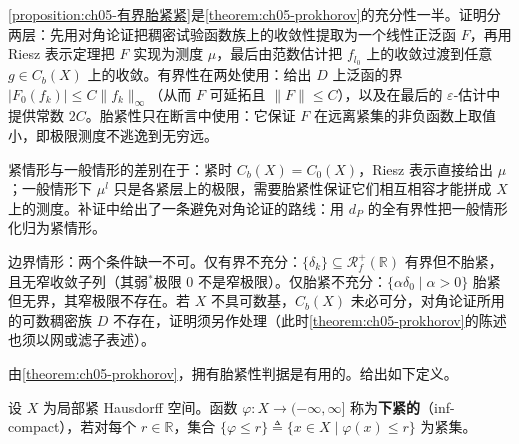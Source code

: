 \documentclass[../../main.tex]{subfiles}%
\begin{document}
\begin{remark}\label{remark:ch05-有界胎紧紧动机}
\cref{proposition:ch05-有界胎紧紧}是\cref{theorem:ch05-prokhorov}的充分性一半。证明分两层：先用对角论证把稠密试验函数族上的收敛性提取为一个线性正泛函 $F$，再用 Riesz 表示定理把 $F$ 实现为测度 $\mu$，最后由范数估计把 $f_{l_0}$ 上的收敛过渡到任意 $g\in C_b(X)$ 上的收敛。有界性在两处使用：给出 $D$ 上泛函的界 $|F_0(f_k)|\leqslant C\|f_k\|_\infty$（从而 $F$ 可延拓且 $\|F\|\leqslant C$），以及在最后的 $\varepsilon$-估计中提供常数 $2C$。胎紧性只在断言中使用：它保证 $F$ 在远离紧集的非负函数上取值小，即极限测度不逃逸到无穷远。

紧情形与一般情形的差别在于：紧时 $C_b(X)=C_0(X)$，Riesz 表示直接给出 $\mu$；一般情形下 $\mu^l$ 只是各紧层上的极限，需要胎紧性保证它们相互相容才能拼成 $X$ 上的测度。补证中给出了一条避免对角论证的路线：用 $d_P$ 的全有界性把一般情形化归为紧情形。

边界情形：两个条件缺一不可。仅有界不充分：$\{\delta_k\}\subseteq\mathscr{R}^+_f(\mathbb{R})$ 有界但不胎紧，且无窄收敛子列（其弱$^*$极限 $0$ 不是窄极限）。仅胎紧不充分：$\{\alpha\delta_0\mid\alpha>0\}$ 胎紧但无界，其窄极限不存在。若 $X$ 不具可数基，$C_b(X)$ 未必可分，对角论证所用的可数稠密族 $D$ 不存在，证明须另作处理（此时\cref{theorem:ch05-prokhorov}的陈述也须以网或滤子表述）。
\end{remark}

由\cref{theorem:ch05-prokhorov}，拥有胎紧性判据是有用的。给出如下定义。

\begin{definition}\label{definition:ch05-下紧}
设 $X$ 为局部紧 Hausdorff 空间。函数 $\varphi:X\to(-\infty,\infty]$ 称为\textbf{下紧的}（inf-compact），若对每个 $r\in\mathbb{R}$，集合 $\{\varphi\leqslant r\}\triangleq \{x\in X\mid\varphi(x)\leqslant r\}$ 为紧集。
\end{definition}
\end{document}
